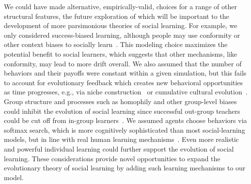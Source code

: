 \documentclass[letterpaper,11.5pt]{scrartcl}
\begin{document}
We could have made alternative, empirically-valid, choices for a range of other structural features, the future exploration of which
will be important to the development of more parsimonious theories of social learning.  %
For example, we only considered success-biased learning, although people may use conformity or other context biases to socially learn~\citep{BoydRicherson1985,Muthukrishna2016a,Smaldino2018b}. This modeling
choice maximizes the potential benefit to social learners, which suggests that
other mechanisms, like conformity, may lead to more drift overall. We also assumed that the number of behaviors and their payoffs were constant within a given simulation, but this fails to account for evolutionary feedback which creates new behavioral opportunities as time progresses, e.g., via niche construction~\citep{Smaldino2012a,Heras-Escribano2020} or cumulative cultural evolution~\citep{Smolla2019,Derex2020}.  Group structure and processes such as homophily and other group-level biases could inhibit the evolution of social learning since successful out-group teachers could be cut off from in-group learners~\citep{Golub2012}. We assumed agents choose behaviors via softmax
search, which is more cognitively sophisticated than most social-learning models, but in line with real human learning
mechanisms~\citep{Schulz2020a,Wu2022}. Even more realistic and powerful individual learning could further support the evolution of
social learning. These considerations provide novel opportunities to expand the evolutionary theory of social learning by adding
such learning mechanisms to our model.

\end{document}
